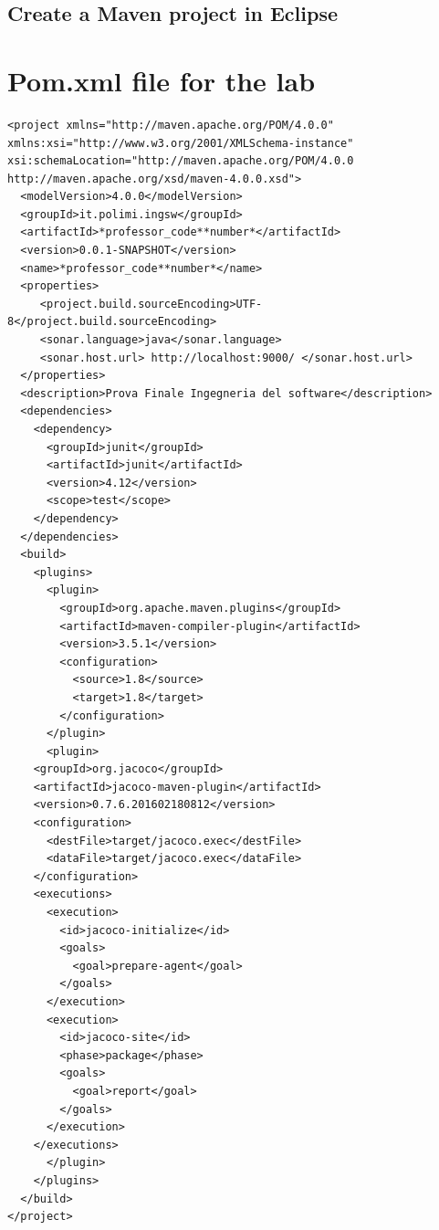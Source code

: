 \documentclass{article}
\begin{document}
\subsection{Create a Maven project in Eclipse}

\section{Pom.xml file for the lab}

\begin{lstlisting}
<project xmlns="http://maven.apache.org/POM/4.0.0" xmlns:xsi="http://www.w3.org/2001/XMLSchema-instance" xsi:schemaLocation="http://maven.apache.org/POM/4.0.0 http://maven.apache.org/xsd/maven-4.0.0.xsd">
  <modelVersion>4.0.0</modelVersion>
  <groupId>it.polimi.ingsw</groupId> 
  <artifactId>*professor_code**number*</artifactId> 
  <version>0.0.1-SNAPSHOT</version>
  <name>*professor_code**number*</name>
  <properties>
     <project.build.sourceEncoding>UTF-8</project.build.sourceEncoding>
     <sonar.language>java</sonar.language>
     <sonar.host.url> http://localhost:9000/ </sonar.host.url>
  </properties>
  <description>Prova Finale Ingegneria del software</description>
  <dependencies>
    <dependency>
      <groupId>junit</groupId>
      <artifactId>junit</artifactId>
      <version>4.12</version>
      <scope>test</scope>
    </dependency>
  </dependencies>
  <build>
    <plugins>
      <plugin>
        <groupId>org.apache.maven.plugins</groupId>
        <artifactId>maven-compiler-plugin</artifactId>
        <version>3.5.1</version>
        <configuration>
          <source>1.8</source>
          <target>1.8</target>
        </configuration>
      </plugin>
      <plugin>
	<groupId>org.jacoco</groupId>
	<artifactId>jacoco-maven-plugin</artifactId>
	<version>0.7.6.201602180812</version>
	<configuration>
	  <destFile>target/jacoco.exec</destFile>
	  <dataFile>target/jacoco.exec</dataFile>
	</configuration>
	<executions>
	  <execution>
	    <id>jacoco-initialize</id>
	    <goals>
	      <goal>prepare-agent</goal>
	    </goals>
	  </execution>
	  <execution>
	    <id>jacoco-site</id>
	    <phase>package</phase>
	    <goals>
	      <goal>report</goal>
	    </goals>
	  </execution>
	</executions>
      </plugin>
    </plugins>
  </build>
</project>
\end{lstlisting}

\fi
\end{document}
